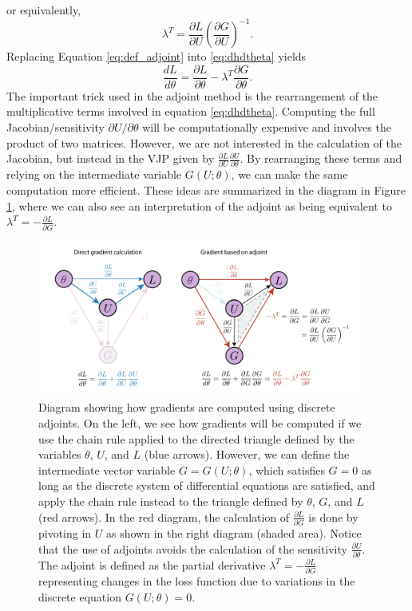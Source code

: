 or equivalently,
\begin{equation}
    \lambda^T = \frac{\partial L}{\partial U} \left( \frac{\partial G}{\partial U} \right)^{-1}.
    \label{eq:def_adjoint}
\end{equation}
Replacing Equation \eqref{eq:def_adjoint} into \eqref{eq:dhdtheta} yields
\begin{equation}
    \frac{dL}{d\theta} 
    =
    \frac{\partial L}{\partial \theta} 
    - 
    \lambda^T \frac{\partial G}{\partial \theta}.
    \label{eq:gradient-adjoint-state-method}
\end{equation}
The important trick used in the adjoint method is the rearrangement of the multiplicative terms involved in equation \eqref{eq:dhdtheta}. 
Computing the full Jacobian/sensitivity $\partial U / \partial \theta$ will be computationally expensive and involves the product of two matrices. 
However, we are not interested in the calculation of the Jacobian, but instead in the VJP given by $\frac{\partial L}{\partial U} \frac{\partial U}{\partial \theta}$. 
By rearranging these terms and relying on the intermediate variable $G(U; \theta)$, we can make the same computation more efficient. 
These ideas are summarized in the diagram in Figure \ref{fig:discrete-adjoint}, where we can also see an interpretation of the adjoint as being equivalent to $\lambda^T = - \frac{\partial L}{\partial G}$. 

\begin{figure}[t]
    \centering
    \includegraphics[width=0.95\textwidth]{figures/discrete_adjoint.pdf}
    \caption{Diagram showing how gradients are computed using discrete adjoints. On the left, we see how gradients will be computed if we use the chain rule applied to the directed triangle defined by the variables $\theta$, $U$, and $L$ (blue arrows). However, we can define the intermediate vector variable $G = G(U; \theta)$, which satisfies $G  = 0$ as long as the discrete system of differential equations are satisfied, and apply the chain rule instead to the triangle defined by $\theta$, $G$, and $L$ (red arrows). In the red diagram, the calculation of $\frac{\partial L}{\partial G}$ is done by pivoting in $U$ as shown in the right diagram (shaded area). Notice that the use of adjoints avoids the calculation of the sensitivity $\frac{\partial U}{\partial \theta}$. The adjoint is defined as the partial derivative $\lambda^T = - \frac{\partial L}{\partial G}$ representing changes in the loss function due to variations in the discrete equation $G(U; \theta) = 0$. 
    }
    \label{fig:discrete-adjoint}
\end{figure}


